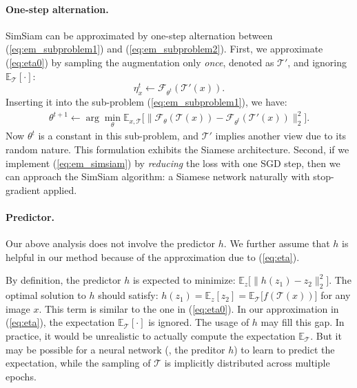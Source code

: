 \documentclass[final]{cvpr}
\newcommand{\z}{{z}}  %
\begin{document}
\paragraph{One-step alternation.} SimSiam can be approximated by one-step alternation between (\ref{eq:em_subproblem1}) and (\ref{eq:em_subproblem2}).
First, we approximate (\ref{eq:eta0}) by 
sampling the augmentation only \emph{once}, denoted as $\mathcal{T}'$, and ignoring $\mathbb{E}_{\mathcal{T}}[\cdot]$:
\begin{equation}
\eta^{t}_x \leftarrow
	\mathcal{F}_{\theta^t}(\mathcal{T'}(x)).
\label{eq:eta}
\end{equation}
Inserting it into the sub-problem (\ref{eq:em_subproblem1}), we have:
\begin{gather}
\theta^{t+1} \leftarrow \arg\min_{\theta}
\mathbb{E}_{x, \mathcal{T}}
\Big[
	\big\|
	\mathcal{F}_\theta(\mathcal{T}(x)) - \mathcal{F}_{\theta^{t}}(\mathcal{T'}(x))
	\big\|_2^2
\Big].
\label{eq:em_simsiam}
\end{gather}
Now $\theta^{t}$ is a constant in this sub-problem, and $\mathcal{T'}$ implies another view due to its random nature. This formulation exhibits the Siamese architecture. 
Second, if we implement (\ref{eq:em_simsiam}) by \emph{reducing} the loss with one SGD step, then we can approach the SimSiam algorithm: a Siamese network naturally with stop-gradient applied.

\paragraph{Predictor.}
Our above analysis does not involve the predictor $h$. We further assume that $h$ is helpful in our method because of the approximation due to (\ref{eq:eta}).

By definition, the predictor $h$ is expected to minimize:
$
\mathbb{E}_z
\Big[
	\big\|
	h(\z_1)
	-
	z_2
	\big\|^2_2
\Big]
$.
The optimal solution to $h$ should satisfy:
$
h(z_1)\!=\!\mathbb{E}_z
[
	z_2
]
\!=\!
\mathbb{E}_{\mathcal{T}}
\big[
	f(\mathcal{T}(x))
\big]
$ for any image $x$.
This term is similar to the one in (\ref{eq:eta0}).
In our approximation in (\ref{eq:eta}),
the expectation $\mathbb{E}_{\mathcal{T}}[\cdot]$ is ignored. The usage of $h$ may fill this gap.
In practice, it would be unrealistic to actually compute the expectation $\mathbb{E}_{\mathcal{T}}$. But it may be possible for a neural network (\eg, the preditor $h$) to learn to predict the expectation, while the sampling of $\mathcal{T}$ is implicitly distributed across multiple epochs. 
\end{document}
